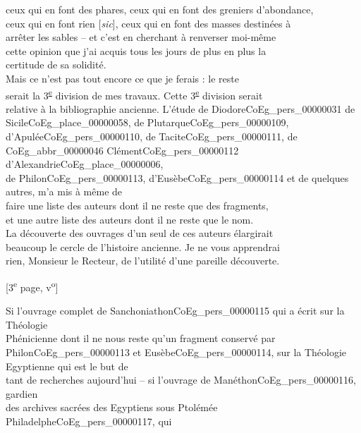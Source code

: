 \documentclass{book}
\begin{document}
ceux qui en font des phares, ceux qui en font des greniers d’abondance,\\
ceux qui en font rien [\textit{sic}], ceux qui en font des masses destinées à\\
arrêter les sables – et c’est en cherchant à renverser moi-même\\
cette opinion que j’ai acquis tous les jours de plus en plus la\\
certitude de sa solidité.\\
\indent Mais ce n’est pas tout encore ce que je ferais : le reste\\
serait la 3\textsuperscript{\underline{e}} division de mes travaux. Cette 3\textsuperscript{\underline{e}} division serait\\
relative à la bibliographie ancienne. L’étude de Diodore\gls{CoEg_pers_00000031} de\\
Sicile\gls{CoEg_place_00000058}, de Plutarque\gls{CoEg_pers_00000109}, d’Apulée\gls{CoEg_pers_00000110}, de Tacite\gls{CoEg_pers_00000111}, de \gls{CoEg_abbr_00000046} Clément\gls{CoEg_pers_00000112} d’Alexandrie\gls{CoEg_place_00000006},\\
de Philon\gls{CoEg_pers_00000113}, d’Eusèbe\gls{CoEg_pers_00000114} et de quelques autres, m’a mis à même de\\
faire une liste des auteurs dont il ne reste que des fragments,\\
et une autre liste des auteurs dont il ne reste que le nom.\\
La découverte des ouvrages d’un seul de ces auteurs élargirait\\
beaucoup le cercle de l’histoire ancienne. Je ne vous apprendrai\\
rien, Monsieur le Recteur, de l’utilité d’une pareille découverte.
{\footnotesize \begin{center} {[3\textsuperscript{e} page, v\textsuperscript{o}]}\end{center}}
\noindent Si l’ouvrage complet de Sanchoniathon\gls{CoEg_pers_00000115} qui a écrit sur la Théologie\\
Phénicienne dont il ne nous reste qu’un fragment conservé par\\
Philon\gls{CoEg_pers_00000113} et Eusèbe\gls{CoEg_pers_00000114}, sur la Théologie Egyptienne qui est le but de\\
tant de recherches aujourd’hui – si l’ouvrage de Manéthon\gls{CoEg_pers_00000116}, gardien\\
des archives sacrées des Egyptiens sous Ptolémée Philadelphe\gls{CoEg_pers_00000117}, qui\\
\end{document}
